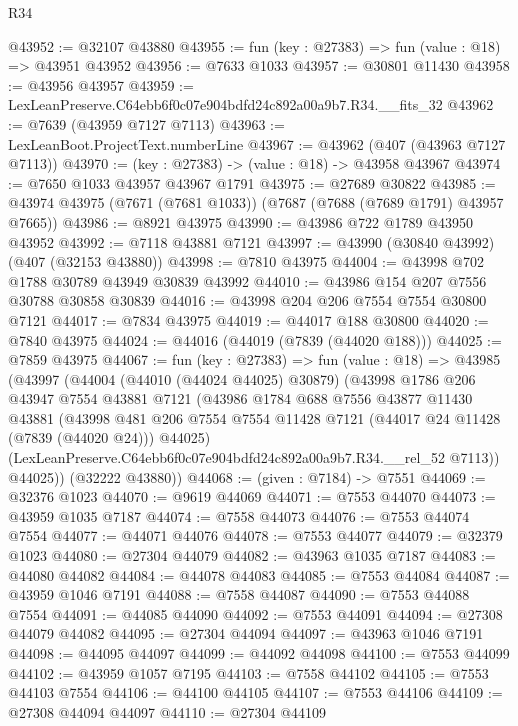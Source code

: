 \begin{lexlean}{R34}
\begin{coremodule}
@43952 := @32107 @43880
@43955 := fun (key : @27383) => fun (value : @18) => @43951 @43952
@43956 := @7633 @1033
@43957 := @30801 @11430
@43958 := @43956 @43957
@43959 := LexLeanPreserve.C64ebb6f0c07e904bdfd24c892a00a9b7.R34.__fits_32
@43962 := @7639 (@43959 @7127 @7113)
@43963 := LexLeanBoot.ProjectText.numberLine
@43967 := @43962 (@407 (@43963 @7127 @7113))
@43970 := (key : @27383) -> (value : @18) -> @43958 @43967
@43974 := @7650 @1033 @43957 @43967 @1791
@43975 := @27689 @30822
@43985 := @43974 @43975 (@7671 (@7681 @1033)) (@7687 (@7688 (@7689 @1791) @43957 @7665))
@43986 := @8921 @43975
@43990 := @43986 @722 @1789 @43950 @43952
@43992 := @7118 @43881 @7121
@43997 := @43990 (@30840 @43992) (@407 (@32153 @43880))
@43998 := @7810 @43975
@44004 := @43998 @702 @1788 @30789 @43949 @30839 @43992
@44010 := @43986 @154 @207 @7556 @30788 @30858 @30839
@44016 := @43998 @204 @206 @7554 @7554 @30800 @7121
@44017 := @7834 @43975
@44019 := @44017 @188 @30800
@44020 := @7840 @43975
@44024 := @44016 (@44019 (@7839 (@44020 @188)))
@44025 := @7859 @43975
@44067 := fun (key : @27383) =>
  fun (value : @18) =>
  @43985
    (@43997
      (@44004
        (@44010 (@44024 @44025) @30879)
        (@43998
          @1786
          @206
          @43947
          @7554
          @43881
          @7121
          (@43986
            @1784
            @688
            @7556
            @43877
            @11430
            @43881
            (@43998
              @481
              @206
              @7554
              @7554
              @11428
              @7121
              (@44017 @24 @11428 (@7839 (@44020 @24)))
              @44025)
            (LexLeanPreserve.C64ebb6f0c07e904bdfd24c892a00a9b7.R34.__rel_52 @7113))
          @44025))
      (@32222 @43880))
@44068 := (given : @7184) -> @7551
@44069 := @32376 @1023
@44070 := @9619 @44069
@44071 := @7553 @44070
@44073 := @43959 @1035 @7187
@44074 := @7558 @44073
@44076 := @7553 @44074 @7554
@44077 := @44071 @44076
@44078 := @7553 @44077
@44079 := @32379 @1023
@44080 := @27304 @44079
@44082 := @43963 @1035 @7187
@44083 := @44080 @44082
@44084 := @44078 @44083
@44085 := @7553 @44084
@44087 := @43959 @1046 @7191
@44088 := @7558 @44087
@44090 := @7553 @44088 @7554
@44091 := @44085 @44090
@44092 := @7553 @44091
@44094 := @27308 @44079 @44082
@44095 := @27304 @44094
@44097 := @43963 @1046 @7191
@44098 := @44095 @44097
@44099 := @44092 @44098
@44100 := @7553 @44099
@44102 := @43959 @1057 @7195
@44103 := @7558 @44102
@44105 := @7553 @44103 @7554
@44106 := @44100 @44105
@44107 := @7553 @44106
@44109 := @27308 @44094 @44097
@44110 := @27304 @44109

\end{coremodule}
\end{lexlean}
